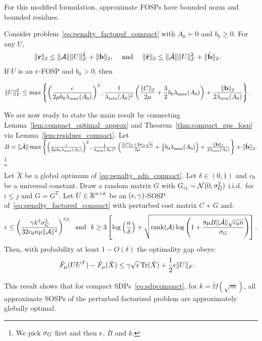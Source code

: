 For this modified formulation, approximate FOSPs have bounded norm and bounded residues.
\begin{lemma}\label{lem:residues_compact}
	Consider problem~\eqref{eq:penalty_factored_compact} with $A_0 \succ 0$ and $b_0 \geq 0$. For any $U$,
	\begin{align*}
		\|\mathbf{r}\|_2 & \leq \|\mathcal{A}\| \|U\|_F^2 + \|\mathbf{b}\|_2, & \textrm{ and } & & \|\tilde {\mathbf{r}}\|_2 & \leq \|\tilde {\mathcal{A}}\| \|U\|_F^2 + \|\tilde {\mathbf{b}}\|_2.
	\end{align*}
	If $U$ is an $\epsilon$-FOSP and $b_0 > 0$, then
	\begin{small}
	\begin{align*}
		\|U\|_F^2 & \leq \max\left\{ \left(\frac{\epsilon}{2\mu b_0 \lambda_{\max}(A_0)}\right)^2, \frac{1}{\lambda_{\min}(A_0)^2} \left(\frac{\|C\|_2}{2\mu} + \frac{3}{2}b_0 \lambda_{\max}(A_0)\right) + \frac{\|\mathbf{b}\|_2}{2\lambda_{\min}(A_0)} \right\}.
	\end{align*}\end{small}
\end{lemma}

We are now ready to state the main result by connecting Lemma~\ref{lem:compact_optimal_approx} and Theorem~\ref{thm:compact_eps_fosp} via Lemma~\ref{lem:residues_compact}. Let $ B = \|\tilde {\mathcal{A}}\| \max\left\{ \left(\frac{\epsilon}{2\mu b_0 \lambda_{\max}(A_0)}\right)^2, \frac{1}{\lambda_{\min}(A_0)^2} \left(\frac{\|C\|_2 + 3\sigma_G\sqrt{n}}{2\mu} + \frac{3}{2}b_0 \lambda_{\max}(A_0)\right) + \frac{\|\mathbf{b}\|_2}{2\lambda_{\min}(A_0)} \right\} + \|\tilde {\mathbf{b}}\|_2.$\footnote{We pick $\sigma_G$ first and then $\epsilon$,  $B$ and $k$.} 
\begin{theorem}\label{thm:optimal_approx_compact} Let $\tilde X$ be a global optimum of \eqref{eq:penalty_sdp_compact}. Let $\delta \in (0, 1)$ and $c_0$ be a universal constant. Draw a random matrix $G$ with $G_{ij} \sim \mathcal{N}(0, \sigma_G^2)$ i.i.d.\ for $i \leq j$ and $G = G^T$. Let $U \in \mathbb{R}^{n\times k}$ be an $(\epsilon, \gamma)$-SOSP of~\eqref{eq:penalty_factored_compact} with perturbed cost matrix $C+G$ and:
\begin{align*}
	\epsilon \leq \left(\frac{\gamma k^2 \sigma_G^2 }{ 32c_0 n  \mu \|\mathcal{A}\|^2}\right)^{\sfrac{2}{3}} ~\text{ and }~k \geq 3\left[\log\left(\frac{n}{\delta}\right) + \sqrt{ \operatorname{rank}(\mathcal{A})   \log\left( 1 + \frac{8 \mu B\|\tilde {\mathcal{A}}\| \sqrt{c_0  n}}{\sigma_G } \right) }  \right].
\end{align*}
Then, with probability at least $1-O(\delta)$ the optimality gap obeys:
\begin{align*}
	\tilde F_\mu(UU^T) - \tilde F_\mu(\tilde X) & \leq \gamma \sqrt{\epsilon} \operatorname{Tr}(\tilde X) + \frac{1}{2}\epsilon \|U\|_F.
\end{align*}
\end{theorem}
%
This result shows that for compact SDPs~\eqref{eq:sdpcompact}, for $k =\tilde{\Omega}(\sqrt{m})$, all approximate SOSPs of the perturbed factorized problem are approximately globally optimal.

